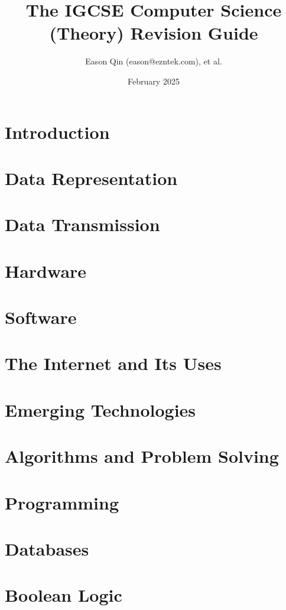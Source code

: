 \documentclass[a4paper, oneside, 11pt]{book} %
\title{The IGCSE Computer Science (Theory) Revision Guide}
\author{Eason Qin (eason@ezntek.com), et al.}
\date{February 2025}
\begin{document}
\maketitle
\label{table-of-contents}
\tableofcontents

\chapter*{Introduction}
\label{introduction}


\chapter{Data Representation}


\chapter{Data Transmission}


\chapter{Hardware}


\chapter{Software}


\chapter{The Internet and Its Uses}


\chapter{Emerging Technologies}


\chapter{Algorithms and Problem Solving}


\chapter{Programming}


\chapter{Databases}


\chapter{Boolean Logic}

\end{document}
